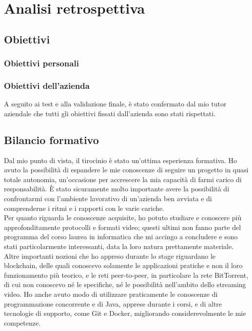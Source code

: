 \chapter{Analisi retrospettiva}
\section{Obiettivi}
\subsection{Obiettivi personali}
\subsection{Obiettivi dell'azienda}
A seguito ai test e alla validazione finale, è stato confermato dal mio tutor aziendale che tutti gli obiettivi fissati dall'azienda sono stati rispettati.

\section{Bilancio formativo}
Dal mio punto di vista, il tirocinio è stato un'ottima esperienza formativa. Ho avuto la possibilità di espandere le mie conoscenze di seguire un progetto in quasi totale autonomia, un'occasione per accrescere la mia capacità di farmi carico di responsabilità. È stato sicuramente molto importante avere la possibilità di confrontarmi con l'ambiente lavorativo di un'azienda ben avviata e di comprenderne i ritmi e i rapporti con le varie cariche.
\\
Per quanto riguarda le conoscenze acquisite, ho potuto studiare e conoscere più approfonditamente protocolli e formati video; questi ultimi non fanno parte del programma del corso laurea in informatica che mi accingo a concludere e sono stati particolarmente interessanti, data la loro natura prettamente materiale. Altre importanti nozioni che ho appreso durante lo stage riguardano le blockchain, delle quali conoscevo solamente le applicazioni pratiche e non il loro funzionamento più teorico, e le reti peer-to-peer, in particolare la rete BitTorrent, di cui non conoscevo né le specifiche, né le possibilità nell'ambito dello streaming video. Ho anche avuto modo di utilizzare praticamente le conoscenze di programmazione concorrente e di Java, apprese durante i corsi, e di altre tecnologie di supporto, come Git e Docker, migliorando considerevolmente le mie competenze.

